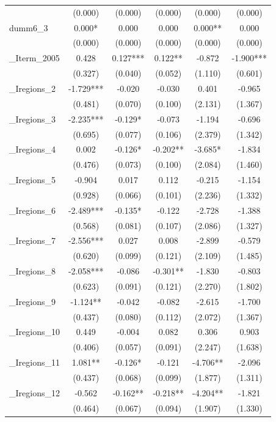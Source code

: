 \documentclass[]{article}
\begin{document}
\begin{tabular}{lccccc}
 & (0.000) & (0.000) & (0.000) & (0.000) & (0.000) \\
dumm6\_3 & 0.000* & 0.000 & 0.000 & 0.000** & 0.000 \\
 & (0.000) & (0.000) & (0.000) & (0.000) & (0.000) \\
\_Iterm\_2005 & 0.428 & 0.127*** & 0.122** & -0.872 & -1.900*** \\
 & (0.327) & (0.040) & (0.052) & (1.110) & (0.601) \\
\_Iregions\_2 & -1.729*** & -0.020 & -0.030 & 0.401 & -0.965 \\
 & (0.481) & (0.070) & (0.100) & (2.131) & (1.367) \\
\_Iregions\_3 & -2.235*** & -0.129* & -0.073 & -1.194 & -0.696 \\
 & (0.695) & (0.077) & (0.106) & (2.379) & (1.342) \\
\_Iregions\_4 & 0.002 & -0.126* & -0.202** & -3.685* & -1.834 \\
 & (0.476) & (0.073) & (0.100) & (2.084) & (1.460) \\
\_Iregions\_5 & -0.904 & 0.017 & 0.112 & -0.215 & -1.154 \\
 & (0.928) & (0.066) & (0.101) & (2.236) & (1.332) \\
\_Iregions\_6 & -2.489*** & -0.135* & -0.122 & -2.728 & -1.388 \\
 & (0.568) & (0.081) & (0.107) & (2.086) & (1.327) \\
\_Iregions\_7 & -2.556*** & 0.027 & 0.008 & -2.899 & -0.579 \\
 & (0.620) & (0.099) & (0.121) & (2.109) & (1.485) \\
\_Iregions\_8 & -2.058*** & -0.086 & -0.301** & -1.830 & -0.803 \\
 & (0.623) & (0.091) & (0.121) & (2.270) & (1.802) \\
\_Iregions\_9 & -1.124** & -0.042 & -0.082 & -2.615 & -1.700 \\
 & (0.437) & (0.080) & (0.112) & (2.072) & (1.367) \\
\_Iregions\_10 & 0.449 & -0.004 & 0.082 & 0.306 & 0.903 \\
 & (0.406) & (0.057) & (0.091) & (2.247) & (1.638) \\
\_Iregions\_11 & 1.081** & -0.126* & -0.121 & -4.706** & -2.096 \\
 & (0.437) & (0.068) & (0.099) & (1.877) & (1.311) \\
\_Iregions\_12 & -0.562 & -0.162** & -0.218** & -4.204** & -1.821 \\
 & (0.464) & (0.067) & (0.094) & (1.907) & (1.330) \\

\end{tabular}
\end{document}
